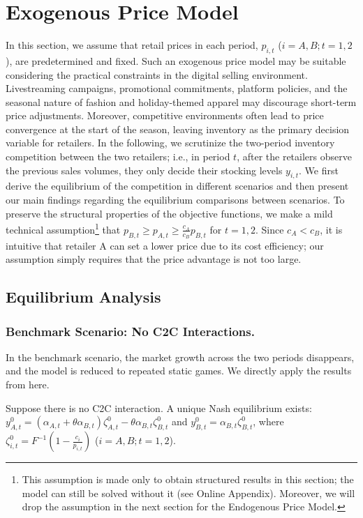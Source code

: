 \documentclass[nonblindrev,copyedit]{informs1}
\begin{document}
\section{Exogenous Price Model}\label{sec:main}

In this section, we assume that retail prices in each period, $p_{i,t}$ ($i=A,B;t=1,2$), are predetermined and fixed. Such an exogenous price model may be suitable considering the practical constraints in the digital selling environment. Livestreaming campaigns, promotional commitments, platform policies, and the seasonal nature of fashion and holiday-themed apparel may discourage short-term price adjustments. Moreover, competitive environments often lead to price convergence at the start of the season, leaving inventory as the primary decision variable for retailers. In the following, we scrutinize the two-period inventory competition between the two retailers; i.e., in period $t$, after the retailers observe the previous sales volumes, they only decide their stocking levels $y_{i,t}$. We first derive the equilibrium of the competition in different scenarios and then present our main findings regarding the equilibrium comparisons between scenarios. To preserve the structural properties of the objective functions, we make a mild technical assumption\footnote{This assumption is made only to obtain structured results in this section; the model can still be solved without it (see Online Appendix). Moreover, we will drop the assumption in the next section for the Endogenous Price Model. } that $p_{B,t}\geq p_{A,t} \geq \frac{c_A}{c_B} p_{B,t}$ for $t=1,2$. Since $c_A<c_B$, it is intuitive that retailer A can set a lower price due to its cost efficiency; our assumption simply requires that the price advantage is not too large.

\subsection{Equilibrium Analysis}\label{model:equil}

\subsubsection{Benchmark Scenario: No C2C Interactions.}
In the benchmark scenario, the market growth across the two periods disappears, and the model is reduced to repeated static games. We directly apply the results from \cite{lm1997} here.
\begin{lemma}
\label{lem:model0}
Suppose there is no C2C interaction. A unique Nash equilibrium exists: $y^{0}_{A,t} = (\alpha_{A,t} + \theta \alpha_{B,t}) \zeta_{A,t}^0 - \theta \alpha_{B,t} \zeta_{B,t}^0$ and $y^{0}_{B,t} = \alpha_{B,t} \zeta_{B,t}^0$, where $\zeta_{i,t}^0= F^{-1}(1 - \frac{c_i}{p_{i,t}})$ ($i = A, B; t= 1, 2$).
\end{lemma}
\end{document}
